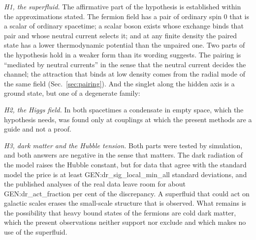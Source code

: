 \emph{H1, the superfluid.} The affirmative part of the hypothesis is established within the
approximations stated. The fermion field has a pair of ordinary spin 0 that is a scalar of ordinary
spacetime; a scalar boson exists whose exchange binds that pair and whose neutral current selects
it; and at any finite density the paired state has a lower thermodynamic potential than the unpaired
one. Two parts of the hypothesis hold in a weaker form than its wording suggests. The pairing is
``mediated by neutral currents'' in the sense that the neutral current decides the channel; the
attraction that binds at low density comes from the radial mode of the same field
(Sec.~\ref{sec:pairing}). And the singlet along the hidden axis is a ground state, but one of a
degenerate family: 

\emph{H2, the Higgs field.} 
In both spacetimes a condensate in empty space, which the hypothesis needs, was found only at
couplings at which the present methods are a guide and not a proof.

\emph{H3, dark matter and the Hubble tension.} Both parts were tested by simulation, and both
answers are negative in the sense that matters. The dark radiation of the model raises the Hubble
constant, but for data that agree with the standard model the price is at least
{{GEN:dr_sig_local_min_all}} standard deviations, and the published analyses of the real data leave
room for about {{GEN:dr_act_fraction}} per cent of the discrepancy. A superfluid that could act on
galactic scales erases the small-scale structure that is observed. What remains is the possibility
that heavy bound states of the fermions are cold dark matter, which the present observations neither
support nor exclude and which makes no use of the superfluid.

